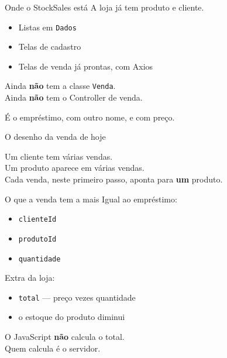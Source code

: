 \documentclass[aspectratio=169,11pt]{beamer}
\begin{document}
\begin{frame}{Onde o StockSales está}
  A loja já tem produto e cliente.

  \vspace{0.4em}
  \begin{itemize}
    \item Listas em \texttt{Dados}
    \item Telas de cadastro
    \item Telas de venda já prontas, com Axios
  \end{itemize}

  \vspace{0.5em}
  Ainda \textbf{não} tem a classe \texttt{Venda}.\\
  Ainda \textbf{não} tem o Controller de venda.

  \vspace{0.5em}
  É o empréstimo, com outro nome, e com preço.
\end{frame}

\begin{frame}{O desenho da venda de hoje}
  \begin{center}
  \end{center}

  \vspace{0.6em}
  Um cliente tem várias vendas.\\
  Um produto aparece em várias vendas.\\
  Cada venda, neste primeiro passo, aponta para \textbf{um} produto.
\end{frame}

\begin{frame}{O que a venda tem a mais}
  Igual ao empréstimo:
  \begin{itemize}
    \item \texttt{clienteId}
    \item \texttt{produtoId}
    \item \texttt{quantidade}
  \end{itemize}

  \vspace{0.4em}
  Extra da loja:
  \begin{itemize}
    \item \texttt{total} --- preço vezes quantidade
    \item o estoque do produto diminui
  \end{itemize}

  \vspace{0.4em}
  O JavaScript \textbf{não} calcula o total.\\
  Quem calcula é o servidor.
\end{frame}
\end{document}
